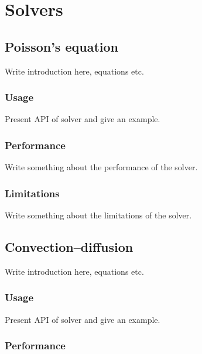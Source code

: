 \chapter{Solvers}


\section{Poisson's equation}

Write introduction here, equations etc.

\subsection{Usage}

Present API of solver and give an example.

\subsection{Performance}

Write something about the performance of the solver.

\subsection{Limitations}

Write something about the limitations of the solver.

\section{Convection--diffusion}

Write introduction here, equations etc.

\subsection{Usage}

Present API of solver and give an example.

\subsection{Performance}

